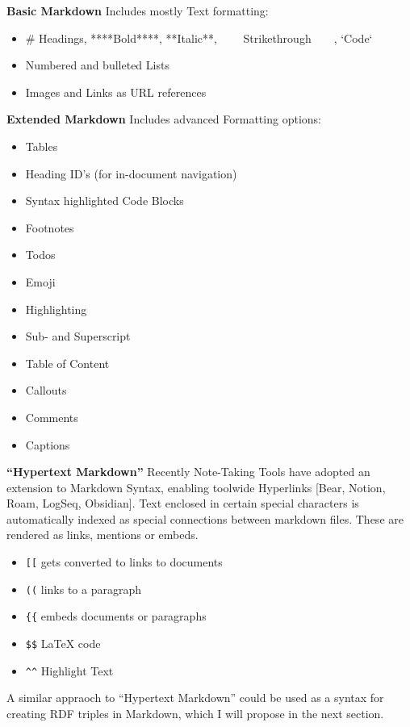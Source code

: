 \textbf{Basic Markdown} Includes mostly Text formatting:
\begin{itemize}
    \item \# Headings, ****Bold****, **Italic**, ~~~~Strikethrough~~~~, `Code`
    \item Numbered and bulleted Lists
    \item Images and Links as URL references
\end{itemize}
    
\textbf{Extended Markdown} Includes advanced Formatting options:
\begin{itemize}
    \item Tables
    \item Heading ID’s (for in-document navigation)
    \item Syntax highlighted Code Blocks
    \item Footnotes
    \item Todos
    \item Emoji
    \item Highlighting
    \item Sub- and Superscript
    \item Table of Content
    \item Callouts
    \item Comments
    \item Captions
\end{itemize}
    
\textbf{“Hypertext Markdown”} Recently Note-Taking Tools have adopted an extension to Markdown Syntax, enabling toolwide Hyperlinks [Bear, Notion, Roam, LogSeq, Obsidian]. Text enclosed in certain special characters is automatically indexed as special connections between markdown files. These are rendered as links, mentions or embeds.

\begin{itemize}
    \item \verb|[[| gets converted to links to documents
    \item \verb|((| links to a paragraph
    \item \verb|{{| embeds documents or paragraphs
    \item \verb|$$| LaTeX code
    \item \verb|^^| Highlight Text
\end{itemize}
    
    

A similar appraoch to “Hypertext Markdown” could be used as a syntax for creating RDF triples in Markdown, which I will propose in the next section.

